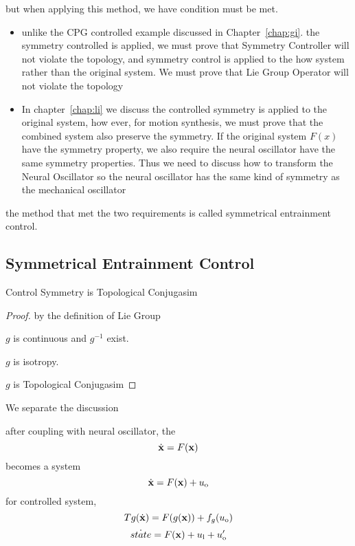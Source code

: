 but when applying this method, we have condition must be met.
\begin{itemize}
\item unlike the CPG controlled example discussed in Chapter~\ref{chap:gi}.
the symmetry controlled is applied, we must prove that Symmetry Controller will not violate the topology, and symmetry control is applied to the how system rather than the original system.
We must prove that Lie Group Operator will not violate the topology

\item In chapter~\ref{chap:li} we discuss the controlled symmetry is applied to the original system, how ever, for motion synthesis, we must prove that the combined system also preserve the symmetry.
If the original system $F(x)$ have the symmetry property, we also require the neural oscillator have the same symmetry properties.
Thus we need to discuss how to transform the Neural Oscillator so the neural oscillator has the same kind of symmetry as the mechanical oscillator
\end{itemize}

the method that met the two requirements is called symmetrical entrainment control.


\subsection{Symmetrical Entrainment Control}

\begin{mythe}
Control Symmetry is Topological Conjugasim
\end{mythe}
\begin{proof}
by the definition of Lie Group

$g$ is continuous and $g^{-1}$ exist.

$g$ is isotropy.

$g$ is Topological Conjugasim

\end{proof}


We separate the discussion

after coupling with neural oscillator, the 
\[
\dot{\mathbf{x}}=F(\mathbf{x})
\]
becomes a system 
\begin{equation}
\label{eq:gc}
\dot{\mathbf{x}}=F(\mathbf{x})+u_{\mathrm{o}}
\end{equation}
for controlled system, 
\begin{equation}
\label{eq:cc}
Tg(\dot{\mathbf{x}})=F(g(\mathbf{x}))+f_g(u_{\mathrm{o}})
\end{equation}
\begin{equation}
\label{eq:con}
\dot{state}=F(\mathbf{x})+u_{\mathrm{l}}+u_{\mathrm{o}}'
\end{equation}

